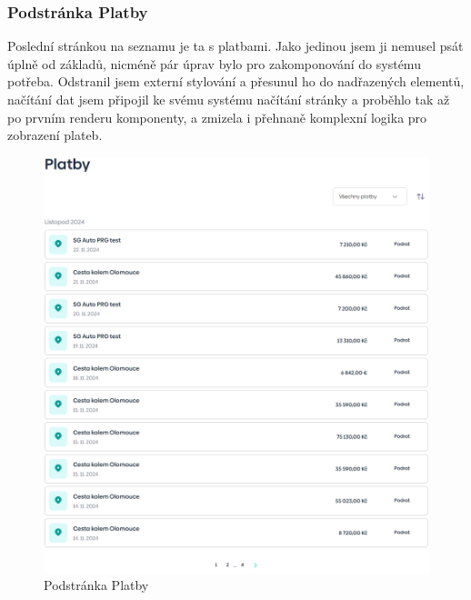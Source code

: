 \newpage
\subsubsection{Podstránka Platby}
Poslední stránkou na seznamu je ta s platbami. Jako jedinou jsem ji nemusel psát úplně od základů, nicméně pár úprav bylo pro zakomponování do systému potřeba. Odstranil jsem externí stylování a přesunul ho do nadřazených elementů, načítání dat jsem připojil ke svému systému načítání stránky a proběhlo tak až po prvním renderu komponenty, a zmizela i přehnaně komplexní logika pro zobrazení plateb.
\\
\begin{figure}[!h]
    \centering
    \includegraphics[width=0.9\linewidth]{obrazky/platby.png}
    \caption{Podstránka Platby}
    \label{fig:enter-label}
\end{figure}
